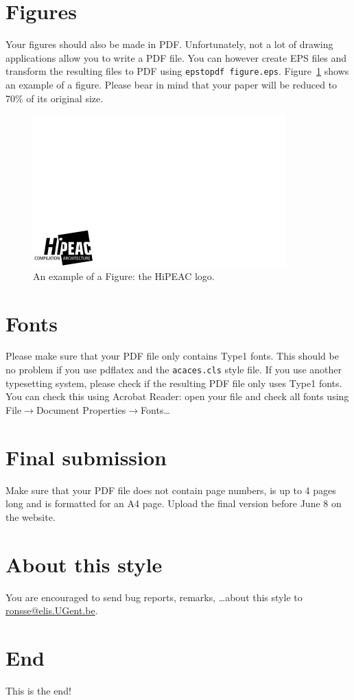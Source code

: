 \documentclass{acaces}
\begin{document}
\section{Figures}
Your figures should also be made in PDF. Unfortunately, not a
lot of drawing applications allow you to write a PDF file. You can however
create EPS files and transform the resulting files to PDF using {\tt epstopdf
        figure.eps}. Figure~\ref{logo} shows an example of a figure.
Please bear in mind that your paper will be reduced to 70\% of its
original size.


\begin{figure}
    \centering
    \includegraphics{hipeac-logo-bw}
    \caption{An example of a Figure: the HiPEAC logo.}
    \label{logo}
\end{figure}


\section{Fonts}
Please make sure that your PDF file only contains Type1 fonts. This should be
no problem if you use pdflatex and the {\tt acaces.cls} style file. If you use
another typesetting system, please check if the resulting PDF file only uses
Type1 fonts.  You can check this using Acrobat Reader: open your file and
check all fonts using File$\rightarrow$Document Properties$\rightarrow$Fonts\ldots

\section{Final submission}
Make sure that your PDF file does not contain page numbers, is
up to 4 pages long and is formatted for an A4 page.
Upload the final version before June 8 on the website.

\section{About this style}
You are encouraged to send bug reports, remarks, \ldots about this style to
\href{mailto:ronsse@elis.UGent.be}{ronsse@elis.UGent.be}.

\section{End}
This is the end! \label{end}


\end{document}
